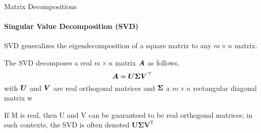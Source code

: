 \begin{frame}{Matrix Decompositions}
    \framesubtitle{Singular Value Decomposition (SVD)}
    SVD generalizes the eigendecomposition of a square matrix to any $m \times n$ matrix.

    \begin{boxed}
        The SVD decomposes a real $m \times n$ matrix $\bm{A}$ as follows,
        $$\bm{A} = \bm{U} \bm{\Sigma} \bm{V}^\top$$
        with $\bm{U}$ and $\bm{V}$ are real orthogonal matrices
        and $\bm{\Sigma} $ a $m \times n$ rectangular diagonal matrix w
    \end{boxed}

    If M is real, then U and V can be guaranteed to be real orthogonal matrices; in such contexts, the SVD is often denoted   $\displaystyle \mathbf {U\Sigma V} ^{\mathsf {T}}$
\end{frame}

